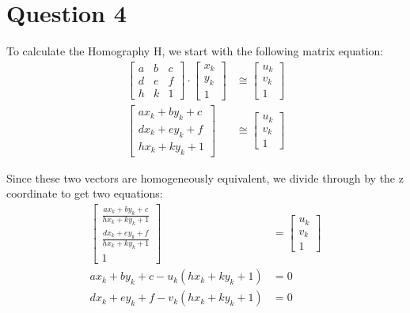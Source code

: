 \documentclass{article} %
\begin{document}


\section{Question 4}

To calculate the Homography H, we start with the following matrix equation:\\
\begin{align*}
\left[
\begin{matrix}
a & b & c\\
d & e & f\\
h & k & 1
\end{matrix}
\right]
\cdot
\left[
\begin{matrix}
x_k\\
y_k\\
1
\end{matrix}
\right]
&\cong
\left[
\begin{matrix}
u_k\\
v_k\\
1
\end{matrix}
\right]\\
\left[
\begin{matrix}
a x_k + b y_k + c\\
d x_k + e y_k + f\\
h x_k + k y_k + 1
\end{matrix}
\right]
&\cong
\left[
\begin{matrix}
u_k\\
v_k\\
1
\end{matrix}
\right]
\end{align*}

Since these two vectors are homogeneously equivalent, we divide through by the z coordinate to get two equations:\\
\begin{align*}
\left[
\begin{matrix}
\frac{a x_k + b y_k + c}{h x_k + k y_k + 1}\\
\frac{d x_k + e y_k + f}{h x_k + k y_k + 1}\\
1
\end{matrix}
\right]
&=
\left[
\begin{matrix}
u_k\\
v_k\\
1
\end{matrix}
\right]\\
a x_k + b y_k + c - u_k (h x_k + k y_k + 1) &= 0\\
d x_k + e y_k + f - v_k (h x_k + k y_k + 1) &= 0
\end{align*}
\end{document}
